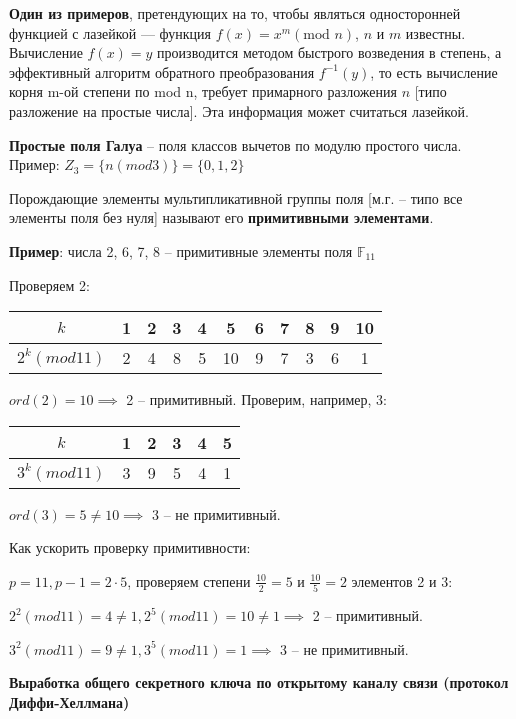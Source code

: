 \textbf{Один из примеров}, претендующих на то, чтобы являться односторонней функцией с лазейкой --- функция $f(x) = x^m (\text{mod } n)$, $n$ и $m$ известны. 
Вычисление $f(x) = y$ производится методом быстрого возведения в степень, а эффективный алгоритм обратного преобразования $f^{-1}(y)$, то есть вычисление корня m-ой степени по mod n, требует примарного разложения $n$ [типо разложение на простые числа]. 
Эта информация может считаться лазейкой.

\textbf{Простые поля Галуа} -- поля классов вычетов по модулю простого числа. Пример: $Z_3 = \{n (mod  3)\} = \{0, 1, 2\}$

Порождающие элементы мультипликативной группы поля [м.г. -- типо все элементы поля без нуля] называют его \textbf{примитивными элементами}.

\textbf{Пример}: числа 2, 6, 7, 8 -- примитивные элементы поля $\mathbb{F}_{11}$

Проверяем 2:

\begin{tabular}{c|c c c c c c c c c c}
    \hline
     $k$           & 1 & 2 & 3 & 4 & 5  & 6 & 7 & 8 & 9 & 10 \\
    \hline
     $2^k (mod 11)$ & 2 & 4 & 8 & 5 & 10 & 9 & 7 & 3 & 6 & 1 \\
    \hline
\end{tabular}

$ord(2) = 10 \implies$ 2 -- примитивный. Проверим, например, 3:

\begin{tabular}{c|c c c c c}
    \hline
     $k$            & 1 & 2 & 3 & 4 & 5 \\
    \hline
     $3^k (mod 11)$ & 3 & 9 & 5 & 4 & 1 \\
    \hline
\end{tabular}

$ord(3) = 5 \neq 10 \implies$ 3 -- не примитивный.

Как ускорить проверку примитивности:

$p = 11, p-1=2 \cdot 5$, проверяем степени $\frac{10}{2} = 5$ и $\frac{10}{5} = 2$ элементов 2 и 3:

$2^2(mod 11) = 4 \neq 1, 2^5(mod 11) = 10 \neq 1 \implies$ 2 -- примитивный.

$3^2(mod 11) = 9 \neq 1, 3^5(mod 11) = 1 \implies$ 3 -- не примитивный.

\textbf{Выработка общего секретного ключа по открытому каналу связи (протокол Диффи-Хеллмана)}

